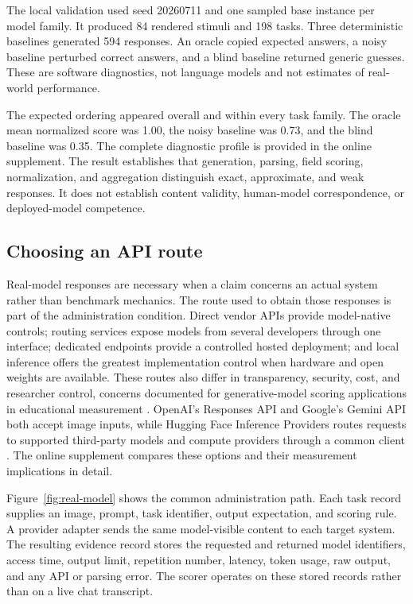 \documentclass[12pt]{article}
\begin{document}
The local validation used seed 20260711 and one sampled base instance per model family. It produced 84 rendered stimuli and 198 tasks. Three deterministic baselines generated 594 responses. An oracle copied expected answers, a noisy baseline perturbed correct answers, and a blind baseline returned generic guesses. These are software diagnostics, not language models and not estimates of real-world performance.

The expected ordering appeared overall and within every task family. The oracle mean normalized score was 1.00, the noisy baseline was 0.73, and the blind baseline was 0.35. The complete diagnostic profile is provided in the online supplement. The result establishes that generation, parsing, field scoring, normalization, and aggregation distinguish exact, approximate, and weak responses. It does not establish content validity, human-model correspondence, or deployed-model competence.

\subsection{Choosing an API route}

Real-model responses are necessary when a claim concerns an actual system rather than benchmark mechanics. The route used to obtain those responses is part of the administration condition. Direct vendor APIs provide model-native controls; routing services expose models from several developers through one interface; dedicated endpoints provide a controlled hosted deployment; and local inference offers the greatest implementation control when hardware and open weights are available. These routes also differ in transparency, security, cost, and researcher control, concerns documented for generative-model scoring applications in educational measurement \citep{ormerod2024gpu}. OpenAI's Responses API and Google's Gemini API both accept image inputs, while Hugging Face Inference Providers routes requests to supported third-party models and compute providers through a common client \citep{openai2026vision,google2026vision,huggingface2026providers}. The online supplement compares these options and their measurement implications in detail.

Figure~\ref{fig:real-model} shows the common administration path. Each task record supplies an image, prompt, task identifier, output expectation, and scoring rule. A provider adapter sends the same model-visible content to each target system. The resulting evidence record stores the requested and returned model identifiers, access time, output limit, repetition number, latency, token usage, raw output, and any API or parsing error. The scorer operates on these stored records rather than on a live chat transcript.
\end{document}
